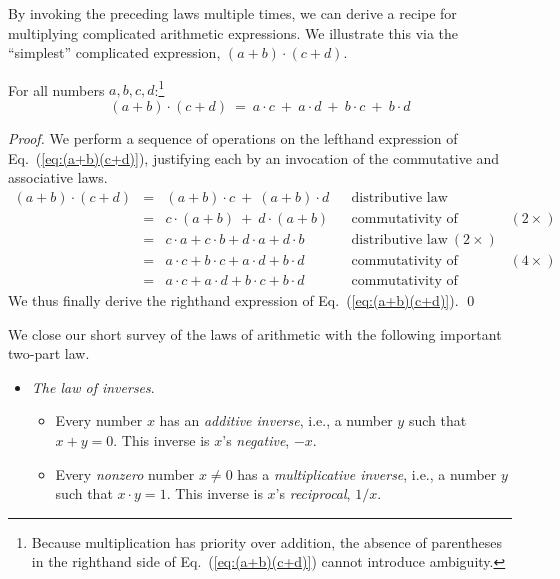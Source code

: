 By invoking the preceding laws multiple times, we can derive a recipe for multiplying complicated arithmetic expressions.  We illustrate this via the ``simplest'' complicated expression, $(a+b) \cdot (c+d)$.

\begin{prop}
\label{prop:(a+b)(c+d)}
For all numbers $a, b, c, d$:\footnote{Because multiplication has priority over addition, the absence of parentheses in the righthand side of Eq.~(\ref{eq:(a+b)(c+d)}) cannot introduce ambiguity.}
\begin{equation}
\label{eq:(a+b)(c+d)}
(a+b) \cdot (c+d) \ = \ a \cdot c \ + \ a \cdot d \ + \ b \cdot c \ + \ b \cdot d
\end{equation}
\end{prop}

\begin{proof}
We perform a sequence of operations on the lefthand expression of Eq.~(\ref{eq:(a+b)(c+d)}), justifying each by an invocation of the commutative and associative laws.
\[
\begin{array}{lclll}
(a+b) \cdot (c+d) & = & (a+b) \cdot c \ + \ (a+b) \cdot d
& & \mbox{distributive law} \\ 
  & = & c \cdot (a+b) \ + \ d \cdot (a+b)
& & \mbox{commutativity of multiplication} \ (2 \times) \\
  & = & c \cdot a + c \cdot b + d \cdot a + d \cdot b 
& & \mbox{distributive law} \ (2 \times) \\
  & = & a \cdot c + b \cdot c + a \cdot d + b \cdot d
& & \mbox{commutativity of multiplication} \ (4 \times) \\
  & = &  a \cdot c + a \cdot d + b \cdot c + b \cdot d
& & \mbox{commutativity of addition}
\end{array}
\]
We thus finally derive the righthand expression of Eq.~(\ref{eq:(a+b)(c+d)}).  \qed
\end{proof}

\medskip

 
 
 

We close our short survey of the laws of arithmetic with the following important two-part law.
\begin{itemize}
\item
{\it The law of inverses}.
 \begin{itemize}
 \item
Every number $x$ has an {\em additive inverse}, i.e., a number $y$ such that $x+y =0$.  This inverse is $x$'s {\it negative}, $-x$.
  \medskip\item
Every {\em nonzero} number $x \neq 0$ has a {\em multiplicative inverse}, i.e., a number $y$ such that $x \cdot y = 1$.  This inverse is $x$'s {\it reciprocal}, $1/x$.
  \end{itemize}
\end{itemize}

